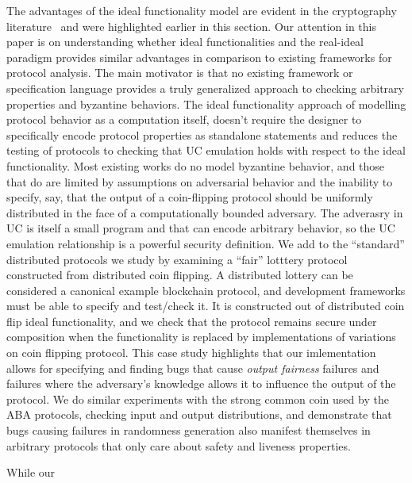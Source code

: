 The advantages of the ideal functionality model are evident in the cryptography
literature~\cite{people, praising, it} and were highlighted earlier in this
section.  Our attention in this paper is on understanding whether ideal
functionalities and the real-ideal paradigm provides similar advantages in
comparison to existing frameworks for protocol analysis.  The main motivator is
that no existing framework or specification language provides a truly
generalized approach to checking arbitrary properties and byzantine behaviors.
The ideal functionality approach of modelling protocol behavior as a
computation itself, doesn't require the designer to specifically encode
protocol properties as standalone statements and reduces the testing of
protocols to checking that UC emulation holds with respect to the ideal
functionality.  Most existing works do no model byzantine behavior, and those
that do are limited by assumptions on adversarial behavior and the inability to
specify, say, that the output of a coin-flipping protocol should be uniformly
distributed in the face of a computationally bounded adversary.  The adverasry
in UC is itself a small program and that can encode arbitrary behavior, so the
UC emulation relationship is a powerful security definition.  We add to the
``standard'' distributed protocols we study by examining a ``fair'' lotttery
protocol constructed from distributed coin flipping.  A distributed lottery can
be considered a canonical example blockchain protocol, and development
frameworks must be able to specify and test/check it.  It is constructed out of
distributed coin flip ideal functionality, and we check that the protocol
remains secure under composition when the functionality is replaced by
implementations of variations on coin flipping protocol.  This case study
highlights that our imlementation allows for specifying and finding bugs that
cause \emph{output fairness} failures and failures where the adversary's
knowledge allows it to influence the output of the protocol.  We do similar
experiments with the strong common coin used by the ABA protocols, checking
input and output distributions, and demonstrate that bugs causing failures in
randomness generation also manifest themselves in arbitrary protocols that only
care about safety and liveness properties.

While our 




